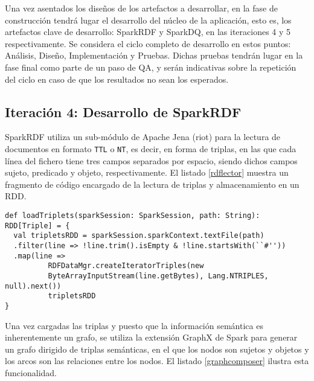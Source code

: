 Una vez asentados los diseños de los artefactos a desarrollar, en la fase de
construcción tendrá lugar el desarrollo del núcleo de la aplicación, esto es,
los artefactos clave de desarrollo: SparkRDF y SparkDQ, en las iteraciones 4 y 5
respectivamente. Se considera el ciclo completo de desarrollo en estos puntos:
Análisis, Diseño, Implementación y Pruebas. Dichas pruebas tendrán lugar en la
fase final como parte de un paso de \acs{QA}, y serán indicativas sobre la
repetición del ciclo en caso de que los resultados no sean los esperados. 

\subsection{Iteración 4: Desarrollo de SparkRDF}
\label{iteracion4}


SparkRDF utiliza un sub-módulo de Apache Jena (riot) para la lectura de
documentos en formato \texttt{TTL} o \texttt{NT}, es decir, en forma de triplas, en las que cada línea
del fichero tiene tres campos separados por espacio, siendo dichos campos sujeto,
predicado y objeto, respectivamente. El listado \ref{rdflector} muestra un
fragmento de código encargado de la lectura de triplas y almacenamiento en un
RDD. 

\lstset{escapechar=@,language=scala}
\begin{lstlisting}[caption={Fragmento del lector de triplas},captionpos=b, label=rdflector]
def loadTriplets(sparkSession: SparkSession, path: String): RDD[Triple] = {
  val tripletsRDD = sparkSession.sparkContext.textFile(path)
  .filter(line => !line.trim().isEmpty & !line.startsWith(``#''))
  .map(line =>
          RDFDataMgr.createIteratorTriples(new
          ByteArrayInputStream(line.getBytes), Lang.NTRIPLES, null).next())
          tripletsRDD
}  
\end{lstlisting}

Una vez cargadas las triplas y puesto que la información semántica es
inherentemente un grafo, se utiliza la extensión GraphX de Spark para generar un
grafo dirigido de triplas semánticas, en el que los nodos son sujetos y objetos y los
arcos son las relaciones entre los nodos. El listado \ref{graphcomposer} ilustra
esta funcionalidad. 

